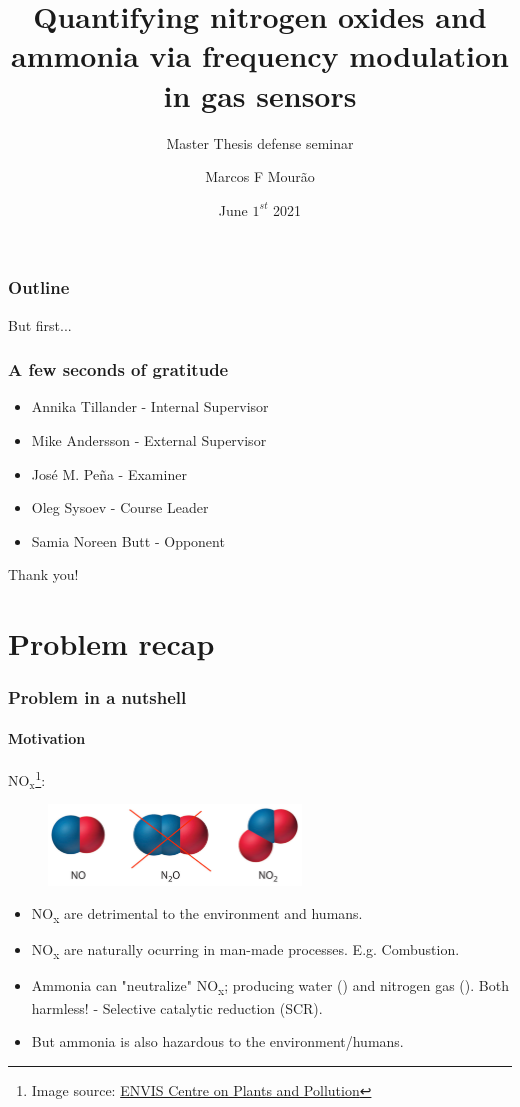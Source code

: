 \documentclass{beamer}
\title{Quantifying nitrogen oxides and ammonia via frequency modulation in gas sensors}
\subtitle{Master Thesis defense seminar}
\author{Marcos F Mourão}
\date{June $1^{st}$ 2021}
\newcommand{\nox}{\texorpdfstring{NO\textsubscript{x}}{NOx}\xspace}
\begin{document}
	\begin{frame}
		\titlepage
	\end{frame}

\begin{frame}
	\frametitle{Outline}
	\tableofcontents
\end{frame}

\begin{frame}
	\centering
	\Huge But first...
\end{frame}


\begin{frame}
	\frametitle{A few seconds of gratitude}
	\begin{itemize}
		\item Annika Tillander - Internal Supervisor
		\item Mike Andersson - External Supervisor
		\item José M. Peña - Examiner
		\item Oleg Sysoev - Course Leader
		\item Samia Noreen Butt - Opponent
	\end{itemize}
	\hspace{1cm}

	\centering
	\Huge Thank you!
	\end{frame}




\section{Problem recap}
\begin{frame}
	\frametitle{Problem in a nutshell}
	\framesubtitle{Motivation}
	$\text{NO}_{\text{x}}$\footnote{Image source: \href{http://www.nbrienvis.nic.in/Database/1_2039.aspx}{ENVIS Centre on Plants and Pollution}}:
	\begin{figure}[!htb]
		\centering
		\includegraphics[width=0.6\textwidth]{../../figures/nox-molecules.jpg}
	\end{figure} 

	
	\begin{itemize}
		\item \nox are detrimental to the environment and humans.
		
		
		\item \nox  are naturally ocurring in man-made processes. E.g. Combustion.
		
		
		\item Ammonia can "neutralize" \nox; producing water () and nitrogen gas (). Both harmless! - Selective catalytic reduction (SCR).
		
		
		\item But ammonia is also hazardous to the environment/humans.
	\end{itemize}
	
\end{frame}
\end{document}
